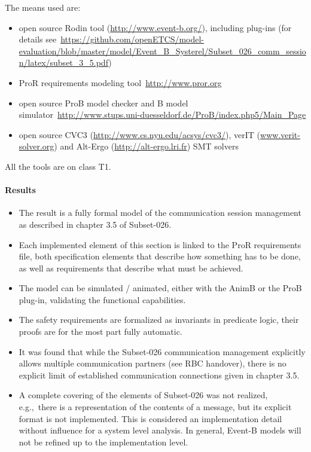 The means used are:
\begin{itemize}
\item open source Rodin tool (\url{http://www.event-b.org/}), including plug-ins
  (for details
  see~\url{https://github.com/openETCS/model-evaluation/blob/master/model/Event_B_Systerel/Subset_026_comm_session/latex/subset_3_5.pdf})
\item ProR requirements modeling tool~\url{http://www.pror.org}
\item open source ProB model checker and B model
  simulator~\url{http://www.stups.uni-duesseldorf.de/ProB/index.php5/Main_Page}
\item open source CVC3 (\url{http://www.cs.nyu.edu/acsys/cvc3/}), verIT
  (\url{www.verit-solver.org}) and Alt-Ergo (\url{http://alt-ergo.lri.fr}) SMT
  solvers
\end{itemize}

All the tools are on class T1.

\paragraph{Results}


\begin{itemize}
\item The result is a fully formal model of the communication session management
  as described in chapter 3.5 of Subset-026.
\item Each implemented element of this section is linked to the ProR
  requirements file, both specification elements that describe how something has
  to be done, as well as requirements that describe what must be achieved.
\item The model can be simulated / animated, either with the AnimB or the ProB
  plug-in, validating the functional capabilities.
\item The safety requirements are formalized as invariants in predicate logic,
  their proofs are for the most part fully automatic.
\item It was found that while the Subset-026 communication management explicitly
  allows multiple communication partners (see RBC handover), there is no
  explicit limit of established communication connections given in chapter 3.5.
\item A complete covering of the elements of Subset-026 was not realized, e.g.,\
  there is a representation of the contents of a message, but its explicit
  format is not implemented. This is considered an implementation detail without
  influence for a system level analysis. In general, Event-B models will not be
  refined up to the implementation level.
\end{itemize}

